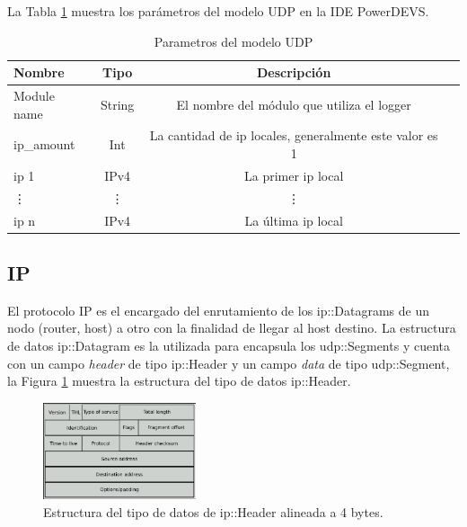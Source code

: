 \documentclass[10pt,a4paper]{article}
\begin{document}
La Tabla \ref{table: parameters UDP} muestra los parámetros del modelo UDP en la IDE PowerDEVS.
\begin{table}[h]
\begin{tabular}{|l|c|c|c|}
  \hline
  \textbf{Nombre} & \textbf{Tipo} & \textbf{Descripción} \\
  \hline
  Module name & String & El nombre del módulo que utiliza el logger \\
  \hline
  ip\_amount & Int & La cantidad de ip locales, generalmente este valor es 1 \\
  \hline
  ip 1 & IPv4 & La primer ip local \\
  \hline
  \vdots & \vdots & \vdots \\
  \hline
  ip n & IPv4 & La última ip local \\
  \hline
\end{tabular}
\caption{Parametros del modelo UDP}
\label{table: parameters UDP}
\end{table}

\subsection{IP}

El protocolo IP es el encargado del enrutamiento de los ip::Datagrams de un nodo (router, host) a otro con la finalidad de llegar al host destino. La estructura de datos ip::Datagram es la utilizada para encapsula los udp::Segments y cuenta con un campo \textit{header} de tipo ip::Header y un campo \textit{data} de tipo udp::Segment, la Figura \ref{figure: ip header} muestra la estructura del tipo de datos ip::Header.  \\

\begin{figure}[!htb]
    \centering
    \includegraphics[width = 0.4\textwidth]{img/png/IP-datagram.png}
    \caption{Estructura del tipo de datos de ip::Header alineada a 4 bytes.}
    \label{figure: ip header}
\end{figure}
\end{document}

